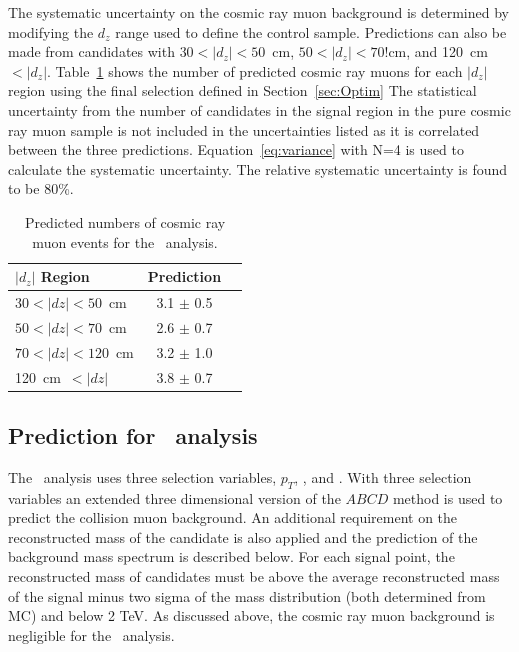 The systematic uncertainty on the cosmic ray muon background is determined by
modifying the $d_z$ range used to define the control sample.  Predictions
can also be made from candidates with $30 < |d_z| < 50$~cm, $50 < |d_z| < 70$!cm, and
120~cm~$< |d_z|$.  Table~\ref{tab:CosmicPred} shows the number of predicted cosmic ray muons
for each $|d_z|$ region using the final selection defined in Section~\ref{sec:Optim}
The statistical uncertainty from the number of candidates in the signal region in the
pure cosmic ray muon sample is not included in the uncertainties listed as it is correlated
between the three predictions.
Equation~\ref{eq:variance} with N=4 is used to calculate the systematic uncertainty.
The relative systematic uncertainty is found to be 80\%.

\begin{table}
 \begin{center}
  \caption{Predicted numbers of cosmic ray muon events for the \muononly\ analysis.}
     \label{tab:CosmicPred}
  \begin{tabular}{|l|c|c|} \hline
   $|d_z|$ Region            & Prediction  \\ \hline
   $30 < |dz| < 50$~cm  & 3.1 $\pm$ 0.5   \\ \hline
   $50 < |dz| < 70$~cm  & 2.6 $\pm$ 0.7   \\ \hline
   $70 < |dz| < 120$~cm & 3.2 $\pm$ 1.0   \\ \hline
   120~cm~$< |dz|$      & 3.8 $\pm$ 0.7   \\ \hline
  \end{tabular}
 \end{center}
\end{table}

\subsection{Prediction for \tktof\ analysis}

The \tktof\ analysis uses three selection variables, $p_T$, \invbeta, and \ias. With three selection variables an extended three dimensional version of the 
$ABCD$ method is used to predict the collision muon background. An additional requirement on the reconstructed mass of the candidate
is also applied and the prediction of the background mass spectrum is described below. 
For each signal point, the reconstructed mass of candidates must be above the average reconstructed mass of the signal minus two sigma of the mass
distribution (both determined from MC) and below 2 TeV.
As discussed above, the cosmic ray muon background is negligible
for the \tktof\ analysis. 

